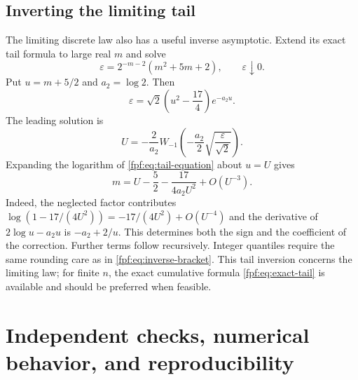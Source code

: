 \documentclass[11pt]{article}
\numberwithin{equation}{section}
\theoremstyle{definition}
\begin{document}
\subsection{Inverting the limiting tail}
The limiting discrete law also has a useful inverse asymptotic. Extend its
exact tail formula to large real $m$ and solve
\[
 \varepsilon=2^{-m-2}(m^2+5m+2),\qquad\varepsilon\downarrow0.
\]
Put $u=m+5/2$ and $a_2=\log2$. Then
\begin{equation}\label{fpf:eq:tail-equation}
 \varepsilon=\sqrt2\left(u^2-\frac{17}4\right)e^{-a_2u}.
\end{equation}
The leading solution is
\begin{equation}\label{fpf:eq:tail-U}
 U=-\frac2{a_2}W_{-1}\left(-\frac{a_2}{2}
                            \sqrt{\frac{\varepsilon}{\sqrt2}}\right).
\end{equation}
Expanding the logarithm of \eqref{fpf:eq:tail-equation} about $u=U$ gives
\begin{equation}\label{fpf:eq:tail-inverse}
 m=U-\frac52-\frac{17}{4a_2U^2}+O(U^{-3}).
\end{equation}
Indeed, the neglected factor contributes
$\log(1-17/(4U^2))=-17/(4U^2)+O(U^{-4})$ and the derivative of
$2\log u-a_2u$ is $-a_2+2/u$. This determines both the sign and the
coefficient of the correction. Further terms follow recursively. Integer
quantiles require the same rounding care as in
\eqref{fpf:eq:inverse-bracket}. This tail inversion concerns the limiting law;
for finite $n$, the exact cumulative formula \eqref{fpf:eq:exact-tail} is
available and should be preferred when feasible.

\section{Independent checks, numerical behavior, and reproducibility}
\end{document}
